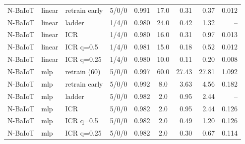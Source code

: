 \begin{table}[h]
\begin{tabular}{@{}lllcccrrr@{}}
N-BaIoT & linear & retrain early & 5/0/0 & 0.991 & 17.0 & 0.31 & 0.37 & 0.012 \\
N-BaIoT & linear & ladder & 1/4/0 & 0.980 & 24.0 & 0.42 & 1.32 & -- \\
N-BaIoT & linear & ICR & 1/4/0 & 0.980 & 16.0 & 0.31 & 0.97 & 0.013 \\
N-BaIoT & linear & ICR q=0.5 & 1/4/0 & 0.981 & 15.0 & 0.18 & 0.52 & 0.012 \\
N-BaIoT & linear & ICR q=0.25 & 1/4/0 & 0.980 & 10.0 & 0.11 & 0.20 & 0.008 \\
N-BaIoT & mlp & retrain (60) & 5/0/0 & 0.997 & 60.0 & 27.43 & 27.81 & 1.092 \\
N-BaIoT & mlp & retrain early & 5/0/0 & 0.992 & 8.0 & 3.63 & 4.56 & 0.182 \\
N-BaIoT & mlp & ladder & 5/0/0 & 0.982 & 2.0 & 0.95 & 2.44 & -- \\
N-BaIoT & mlp & ICR & 5/0/0 & 0.982 & 2.0 & 0.95 & 2.44 & 0.126 \\
N-BaIoT & mlp & ICR q=0.5 & 5/0/0 & 0.982 & 2.0 & 0.49 & 1.20 & 0.126 \\
N-BaIoT & mlp & ICR q=0.25 & 5/0/0 & 0.982 & 2.0 & 0.30 & 0.67 & 0.114 \\
\bottomrule
\end{tabular}
\end{table}

